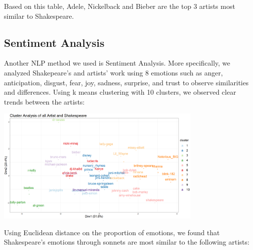 \documentclass[10pt,a4paper]{article}
\begin{document}

Based on this table, Adele, Nickelback and Bieber are the top 3 artists most similar to Shakespeare.

\subsection{Sentiment Analysis}

Another NLP method we used is Sentiment Analysis. More specifically, we analyzed Shakepeare's and artists' work using 8 emotions such as anger, anticipation, disgust, fear, joy, sadness, surprise, and trust to observe similarities and differences. Using k means clustering with 10 clusters, we observed clear trends between the artists:

\begin{center}
\includegraphics[width=10cm]{_assets/ClusterAnalysis_Fit10.png}
\end{center}

Using Euclidean distance on the proportion of emotions, we found that Shakespeare's emotions through sonnets are most similar to the following artists:

   
\begin{table}[ht]
\centering
{}
\caption{Ranked Top 10 Most Similar Music Artist to Shakespeare Based on Sentiments} 
\label{tab:wordranktable}
\end{table}
\end{document}
